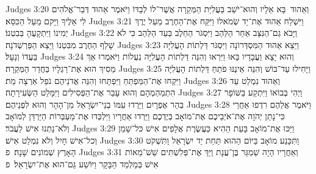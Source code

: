 Judges 3:20	וְאֵהוּד  בָּא אֵלָיו וְהוּא־יֹשֵׁב בַּעֲלִיַּת הַמְּקֵרָה אֲשֶׁר־לוֹ לְבַדּוֹ וַיֹּאמֶר אֵהוּד דְּבַר־אֱלֹהִים לִי אֵלֶיךָ וַיָּקם מֵעַל הַכִּסֵּא׃
Judges 3:21	וַיִּשְׁלַח אֵהוּד אֶת־יַד שְׂמֹאלוֹ וַיִּקַּח אֶת־הַחֶרֶב מֵעַל יֶרֶךְ יְמִינוֹ וַיִּתְקָעֶהָ בְּבִטְנוֹ׃
Judges 3:22	וַיָּבֹא גַם־הַנִּצָּב אַחַר הַלַּהַב וַיִּסְגֹּר הַחֵלֶב בְּעַד הַלַּהַב כִּי לֹא שָׁלַף הַחֶרֶב מִבִּטְנוֹ וַיֵּצֵא הַפַּרְשְׁדֹנָה׃
Judges 3:23	וַיֵּצֵא אֵהוּד הַמִּסְדְּרוֹנָה וַיִּסְגֹּר דַּלְתוֹת הָעֲלִיָּה בַּעֲדוֹ וְנָעָל׃
Judges 3:24	וְהוּא יָצָא וַעֲבָדָיו בָּאוּ וַיִּרְאוּ וְהִנֵּה דַּלְתוֹת הָעֲלִיָּה נְעֻלוֹת וַיֹּאמְרוּ אַךְ מֵסִיךְ הוּא אֶת־רַגְלָיו בַּחֲדַר הַמְּקֵרָה׃
Judges 3:25	וַיָּחִילוּ עַד־בּוֹשׁ וְהִנֵּה אֵינֶנּוּ פֹתֵחַ דַּלְתוֹת הָעֲלִיָּה וַיִּקְחוּ אֶת־הַמַּפְתֵּחַ וַיִּפְתָּחוּ וְהִנֵּה אֲדֹנֵיהֶם נֹפֵל אַרְצָה מֵת׃
Judges 3:26	וְאֵהוּד נִמְלַט עַד הִתְמַהְמְהָם וְהוּא עָבַר אֶת־הַפְּסִילִים וַיִּמָּלֵט הַשְּׂעִירָתָה׃
Judges 3:27	וַיְהִי בְּבוֹאוֹ וַיִּתְקַע בַּשּׁוֹפָר בְּהַר אֶפְרָיִם וַיֵּרְדוּ עִמּוֹ בְנֵי־יִשְׂרָאֵל מִן־הָהָר וְהוּא לִפְנֵיהֶם׃
Judges 3:28	וַיֹּאמֶר אֲלֵהֶם רִדְפוּ אַחֲרַי כִּי־נָתַן יְהֹוָה אֶת־אֹיְבֵיכֶם אֶת־מוֹאָב בְּיֶדְכֶם וַיֵּרְדוּ אַחֲרָיו וַיִּלְכְּדוּ אֶת־מַעְבְּרוֹת הַיַּרְדֵּן לְמוֹאָב וְלֹא־נָתְנוּ אִישׁ לַעֲבֹר׃
Judges 3:29	וַיַּכּוּ אֶת־מוֹאָב בָּעֵת הַהִיא כַּעֲשֶׂרֶת אֲלָפִים אִישׁ כּל־שָׁמֵן וְכל־אִישׁ חָיִל וְלֹא נִמְלַט אִישׁ׃
Judges 3:30	וַתִּכָּנַע מוֹאָב בַּיּוֹם הַהוּא תַּחַת יַד יִשְׂרָאֵל וַתִּשְׁקֹט הָאָרֶץ שְׁמוֹנִים שָׁנָה׃ {פ}
Judges 3:31	וְאַחֲרָיו הָיָה שַׁמְגַּר בֶּן־עֲנָת וַיַּךְ אֶת־פְּלִשְׁתִּים שֵׁשׁ־מֵאוֹת אִישׁ בְּמַלְמַד הַבָּקָר וַיּוֹשַׁע גַּם־הוּא אֶת־יִשְׂרָאֵל׃ {פ}
